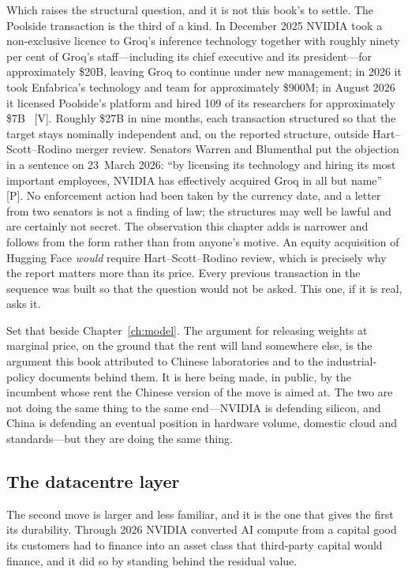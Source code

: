 Which raises the structural question, and it is not this book's to settle. The Poolside transaction is the third of a kind. In December 2025 NVIDIA took a non-exclusive licence to Groq's inference technology together with roughly ninety per cent of Groq's staff---including its chief executive and its president---for approximately \$20B, leaving Groq to continue under new management; in 2026 it took Enfabrica's technology and team for approximately \$900M; in August 2026 it licensed Poolside's platform and hired 109 of its researchers for approximately \$7B~\cite{nvda-structured} [V]. Roughly \$27B in nine months, each transaction structured so that the target stays nominally independent and, on the reported structure, outside Hart--Scott--Rodino merger review. Senators Warren and Blumenthal put the objection in a sentence on 23~March 2026: ``by licensing its technology and hiring its most important employees, NVIDIA has effectively acquired Groq in all but name''~\cite{nvda-structured} [P]. No enforcement action had been taken by the currency date, and a letter from two senators is not a finding of law; the structures may well be lawful and are certainly not secret. The observation this chapter adds is narrower and follows from the form rather than from anyone's motive. An equity acquisition of Hugging Face \emph{would} require Hart--Scott--Rodino review, which is precisely why the report matters more than its price. Every previous transaction in the sequence was built so that the question would not be asked. This one, if it is real, asks it.

Set that beside Chapter~\ref{ch:model}. The argument for releasing weights at marginal price, on the ground that the rent will land somewhere else, is the argument this book attributed to Chinese laboratories and to the industrial-policy documents behind them. It is here being made, in public, by the incumbent whose rent the Chinese version of the move is aimed at. The two are not doing the same thing to the same end---NVIDIA is defending silicon, and China is defending an eventual position in hardware volume, domestic cloud and standards---but they are doing the same thing.

\subsection{The datacentre layer}

The second move is larger and less familiar, and it is the one that gives the first its durability. Through 2026 NVIDIA converted AI compute from a capital good its customers had to finance into an asset class that third-party capital would finance, and it did so by standing behind the residual value.

